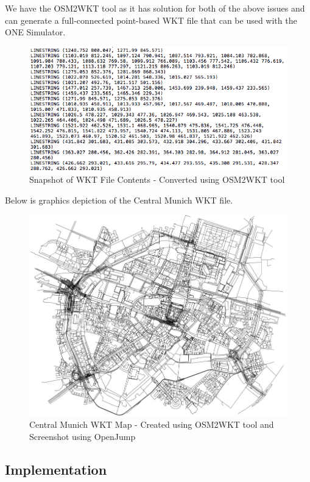 	We have the OSM2WKT tool \cite{mayer2010osm} as it has solution for both of the above issues and can generate a full-connected point-based WKT file that can be used with the ONE Simulator. 
	\newline
	\begin{figure}[h]
		\centering
		\includegraphics[scale=0.55]{./figures/wkt-file-1}
		\caption{Snapshot of WKT File Contents - Converted using OSM2WKT tool \cite{mayer2010osm} }
	\end{figure}
	\newpage
	Below is graphics depiction of the Central Munich WKT file.
	\begin{figure}[h]
		\centering
		\includegraphics[scale=0.5]{./figures/central-munich-wkt}
		\caption{Central Munich WKT Map - Created using OSM2WKT tool \cite{mayer2010osm} and Screenshot using OpenJump \cite{openjump}}
	\end{figure}

\newpage
\subsection{Implementation}
